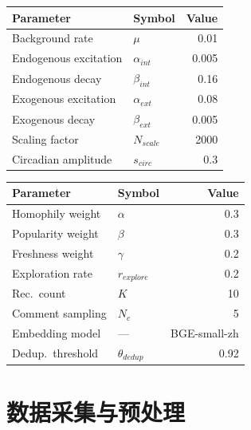 \documentclass[a4paper,fleqn]{cas-sc}
\begin{document}
\noindent
\begin{minipage}[t]{0.48\textwidth}
\centering
{}
\label{tab:hawkes_params}
\small
\renewcommand{\arraystretch}{1.05}
\begin{tabular}{@{}llr@{}}
\toprule
\textbf{Parameter} & \textbf{Symbol} & \textbf{Value} \\
\midrule
Background rate & $\mu$ & 0.01 \\
Endogenous excitation & $\alpha_{int}$ & 0.005 \\
Endogenous decay & $\beta_{int}$ & 0.16 \\
Exogenous excitation & $\alpha_{ext}$ & 0.08 \\
Exogenous decay & $\beta_{ext}$ & 0.005 \\
Scaling factor & $N_{scale}$ & 2000 \\
Circadian amplitude & $s_{circ}$ & 0.3 \\
\bottomrule
\end{tabular}
\end{minipage}
\hfill
\begin{minipage}[t]{0.48\textwidth}
\centering
{}
\label{tab:rec_params}
\small
\renewcommand{\arraystretch}{1.05}
\begin{tabular}{@{}llr@{}}
\toprule
\textbf{Parameter} & \textbf{Symbol} & \textbf{Value} \\
\midrule
Homophily weight & $\alpha$ & 0.3 \\
Popularity weight & $\beta$ & 0.3 \\
Freshness weight & $\gamma$ & 0.2 \\
Exploration rate & $r_{explore}$ & 0.2 \\
Rec.\ count & $K$ & 10 \\
Comment sampling & $N_c$ & 5 \\
Embedding model & --- & BGE-small-zh \\
Dedup.\ threshold & $\theta_{dedup}$ & 0.92 \\
\bottomrule
\end{tabular}
\end{minipage}

\section{数据采集与预处理}
\label{app:data}
\end{document}
